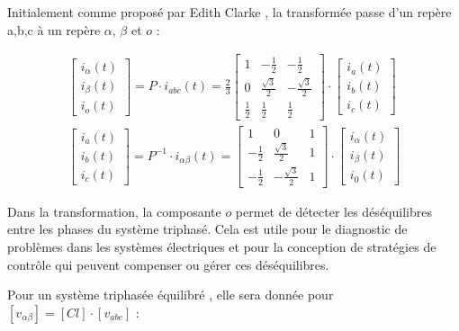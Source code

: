 Initialement comme proposé par Edith Clarke \cite{Duesterhoeft1951}, la transformée passe d'un repère a,b,c à un repère $\alpha$, $\beta$ et $o$ :


\begin{align} 
    \begin{bmatrix}
    i_{\alpha}(t) \\
    i_{\beta}(t) \\
    i_{o}(t)
    \end{bmatrix}
    = P \cdot i_{abc}(t) = \frac{2}{3}
    \begin{bmatrix}
    1 & -\frac{1}{2} & -\frac{1}{2} \\
    0 & \frac{\sqrt{3}}{2} & -\frac{\sqrt{3}}{2} \\
    \frac{1}{2} & \frac{1}{2} & \frac{1}{2}
    \end{bmatrix} \cdot
    \begin{bmatrix}
    i_a(t) \\
    i_b(t) \\
    i_c(t)
    \end{bmatrix} 
    \label{eq:Clarke} \\
    \begin{bmatrix}
    i_a(t) \\
    i_b(t) \\
    i_c(t)
    \end{bmatrix}
    = P^{-1}\cdot i_{\alpha\beta}(t) = 
    \begin{bmatrix}
    1 & 0 & 1 \\
    -\frac{1}{2} & \frac{\sqrt{3}}{2} & 1 \\
    -\frac{1}{2} & -\frac{\sqrt{3}}{2} & 1
    \end{bmatrix} \cdot
    \begin{bmatrix}
    i_{\alpha}(t) \\
    i_{\beta}(t) \\
    i_0(t)
    \end{bmatrix}
    \label{eq:Clarke_inv}
\end{align}

Dans la transformation, la composante $o$ permet de détecter les déséquilibres entre les phases du système triphasé. Cela est utile pour le diagnostic de problèmes dans les systèmes électriques et pour la conception de stratégies de contrôle qui peuvent compenser ou gérer ces déséquilibres.

Pour un système triphasée équilibré \cite{Tahri2007}, elle sera donnée pour $\left[v_{\alpha \beta} \right] = \left[Cl\right] \cdot \left[v_{abc} \right]$ :

